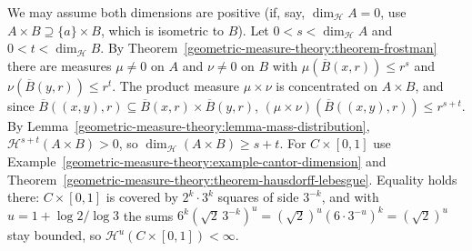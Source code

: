 \begin{solution}
We may assume both dimensions are positive (if, say, $\dim_{\mathcal{H}}A = 0$, use $A \times B \supseteq \{a\} \times B$, which is isometric to $B$). Let $0 < s < \dim_{\mathcal{H}}A$ and $0 < t < \dim_{\mathcal{H}}B$. By
Theorem~\ref{geometric-measure-theory:theorem-frostman} there are measures $\mu \neq 0$ on $A$ and $\nu \neq 0$ on $B$ with $\mu(\overline{B}(x, r)) \leq r^s$ and $\nu(\overline{B}(y, r)) \leq r^t$. The product measure
$\mu \times \nu$ is concentrated on $A \times B$, and since $\overline{B}((x, y), r) \subseteq \overline{B}(x, r) \times \overline{B}(y, r)$,
$(\mu \times \nu)(\overline{B}((x, y), r)) \leq r^{s + t}$. By Lemma~\ref{geometric-measure-theory:lemma-mass-distribution}, $\mathcal{H}^{s+t}(A \times B) > 0$, so $\dim_{\mathcal{H}}(A \times B) \geq s + t$. For
$C \times [0, 1]$ use Example~\ref{geometric-measure-theory:example-cantor-dimension} and Theorem~\ref{geometric-measure-theory:theorem-hausdorff-lebesgue}. Equality holds there: $C \times [0, 1]$ is covered by
$2^k \cdot 3^k$ squares of side $3^{-k}$, and with $u = 1 + \log 2/\log 3$ the sums $6^k(\sqrt2\,3^{-k})^u = (\sqrt2)^u(6 \cdot 3^{-u})^k = (\sqrt2)^u$ stay bounded, so $\mathcal{H}^u(C \times [0, 1]) < \infty$.
\end{solution}
